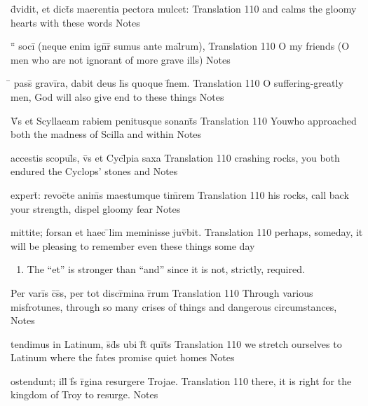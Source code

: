 
\latline
  {d\={\macron {\i}}vidit, et dict\={\macron {\i}}s maerentia pectora mulcet:}
  { Translation }
  {110}
  { and calms the gloomy hearts with these words }
  { Notes }


\latline
  {``\={} soci\={\macron {\i}} (neque enim ign\={}r\={\macron {\i}} sumus ante mal\={}rum),}
  { Translation }
  {110}
  { O my friends (O men who are not ignorant of more grave ills) }
  { Notes }


\latline
  {\={} pass\={\macron {\i}} gravi\={}ra, dabit deus h\={\macron {\i}}s quoque f\={\macron {\i}}nem.}
  { Translation }
  {110}
  { O suffering-greatly men, God will also give end to these things }
  { Notes }


\latline
  {V\={}s et Scyllaeam rabiem penitusque sonant\={\macron {\i}}s}
  { Translation }
  {110}
  { Youwho approached both the madness of Scilla and within }
  { Notes }


\latline
  {accestis scopul\={}s, v\={}s et Cycl\={}pia saxa }
  { Translation }
  {110}
  { crashing rocks, you both endured the Cyclops' stones and }
  { Notes }


\latline
  {expert\={\macron {\i}}:  revoc\={}te anim\={}s maestumque tim\={}rem}
  { Translation }
  {110}
  { his rocks, call back your strength, dispel gloomy fear }
  { Notes }


\latline
  {mittite; forsan et haec \={}lim meminisse juv\={}bit.}
  { Translation }
  {110}
  { perhaps, someday, it will be pleasing to remember even these things some day }
  { \begin{enumerate}
  	\item The ``et'' is stronger than ``and'' since it is not, strictly, required.  
  \end{enumerate} }


\latline
  {Per vari\={}s c\={}s\={}s, per tot discr\={\macron {\i}}mina r\={}rum}
  { Translation }
  {110}
  { Through various misfrotunes, through so many crises of things and dangerous circumstances, }
  { Notes }


\latline
  {tendimus in Latinum, s\={}d\={}s ubi f\={}t\={} qui\={}t\={}s}
  { Translation }
  {110}
  { we stretch ourselves to Latinum where the fates promise quiet homes }
  { Notes }


\latline
  {ostendunt; ill\={\macron {\i}} f\={}s r\={}gina resurgere Trojae.}
  { Translation }
  {110}
  { there, it is right for the kingdom of Troy to resurge. }
  { Notes }



